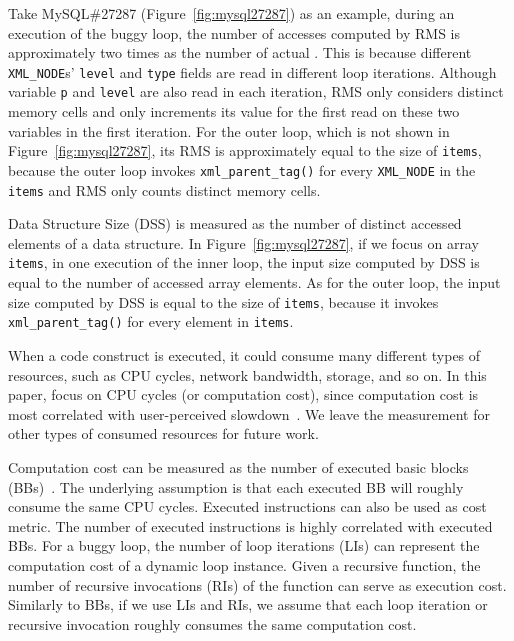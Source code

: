 Take MySQL\#27287 (Figure~\ref{fig:mysql27287}) as an example, 
during an execution of the buggy loop, the number of accesses
computed by RMS is approximately 
two times as the number of actual . 
This is because different \texttt{XML\_NODE}s' \texttt{level} and \texttt{type} 
fields are read in different loop iterations. 
Although variable \texttt{p} and \texttt{level} are also read in each iteration,
RMS only considers distinct memory cells and 
only increments its value for the first read on these 
two variables in the first iteration. 
For the outer loop, which is not shown in Figure~\ref{fig:mysql27287}, 
its RMS is approximately equal to the size of \texttt{items}, 
because the outer loop invokes \texttt{xml\_parent\_tag()} for every
\texttt{XML\_NODE} in the \texttt{items} and RMS only 
counts distinct memory cells. 


Data Structure Size (DSS) is measured as
the number of distinct accessed elements of a data structure.  
%
In Figure~\ref{fig:mysql27287}, if we focus on array \texttt{items},
in one execution of the inner loop, the input size computed by DSS 
is equal to the number of accessed array elements. 
As for the outer loop, the input size computed by DSS  is
equal to the size of  \texttt{items}, because
it invokes \texttt{xml\_parent\_tag()} for every element in \texttt{items}.


When a code construct is executed,
it could consume many different types of resources, 
such as CPU cycles, network bandwidth, storage, and so on.
In this paper, focus on CPU cycles (or computation cost), 
since computation cost is most correlated with user-perceived slowdown~\cite{add cites}.
We leave the measurement for other types of 
consumed resources for future work.

Computation cost can be measured 
as the number of executed basic blocks (BBs)~\cite{Aprof1,Aprof2}.
The underlying assumption is that each executed 
BB will roughly consume the same CPU cycles. 
Executed instructions can also be used as cost metric. 
The number of executed instructions is highly correlated with executed BBs.
For a buggy loop, the number of loop iterations (LIs) can represent 
the computation cost of a dynamic loop instance.
Given a recursive function, the number of recursive invocations (RIs) 
of the function can serve as execution cost.
Similarly to BBs, if we use LIs and RIs, 
we assume that each loop iteration or recursive invocation 
roughly consumes the same computation cost. 



